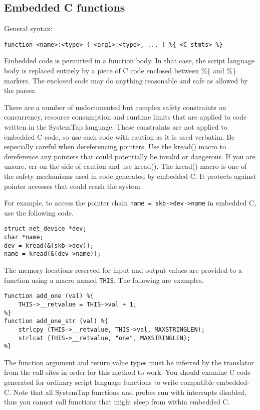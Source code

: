 \documentclass[twoside,english]{article}
\newenvironment{vindent}
{\begin{list}{}{\setlength{\listparindent}{6pt}}
\item[]}
{\end{list}}
\begin{document}
\subsection{Embedded C functions}

General syntax:

\begin{vindent}
\begin{verbatim}
function <name>:<type> ( <arg1>:<type>, ... ) %{ <C_stmts> %}
\end{verbatim}
\end{vindent}
Embedded code is permitted in a function body. In that case, the script language
body is replaced entirely by a piece of C code enclosed between \%\{ and
\%\} markers. The enclosed code may do anything reasonable and safe as allowed
by the parser.

There are a number of undocumented but complex safety constraints on concurrency,
resource consumption and runtime limits that are applied to code written
in the SystemTap language. These constraints are not applied to embedded
C code, so use such code with caution as it is used verbatim. Be especially
careful when dereferencing pointers. Use the kread() macro to dereference
any pointers that could potentially be invalid or dangerous. If you are unsure,
err on the side of caution and use kread(). The kread() macro is one of the
safety mechanisms used in code generated by embedded C. It protects against
pointer accesses that could crash the system.

For example, to access the pointer chain \texttt{name = skb->dev->name} in
embedded C, use the following code.

\begin{vindent}
\begin{verbatim}
struct net_device *dev;
char *name;
dev = kread(&(skb->dev));
name = kread(&(dev->name));
\end{verbatim}
\end{vindent}
The memory locations reserved for input and output values are provided to
a function using a macro named \texttt{THIS}. The following
are examples.

\begin{vindent}
\begin{verbatim}
function add_one (val) %{
    THIS->__retvalue = THIS->val + 1;
%}
function add_one_str (val) %{
    strlcpy (THIS->__retvalue, THIS->val, MAXSTRINGLEN);
    strlcat (THIS->__retvalue, "one", MAXSTRINGLEN);
%}
\end{verbatim}
\end{vindent}
The function argument and return value types must be inferred by the translator
from the call sites in order for this method to work. You should examine
C code generated for ordinary script language functions to write compatible
embedded-C. Note that all SystemTap functions and probes run with interrupts
disabled, thus you cannot call functions that might sleep from within embedded
C.
\end{document}
